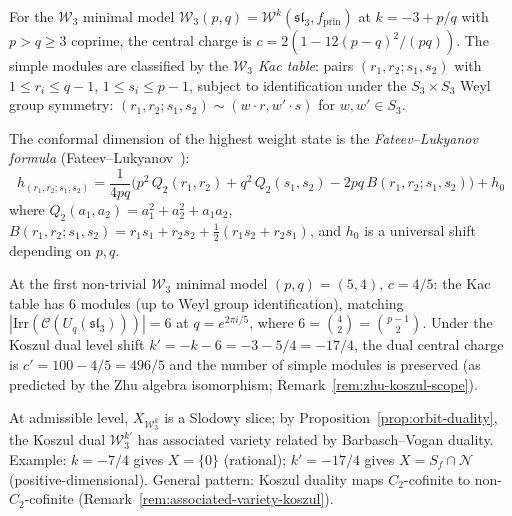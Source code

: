\begin{example}
\label{ex:w3-minimal-modules}
For the $\mathcal{W}_3$ minimal model
$\mathcal{W}_3(p,q) = \mathcal{W}^k(\mathfrak{sl}_3,
f_{\mathrm{prin}})$ at $k = -3 + p/q$ with $p > q \geq 3$
coprime, the central charge is
$c = 2(1 - 12(p-q)^2/(pq))$.  The simple modules are
classified by the \emph{$\mathcal{W}_3$ Kac table}: pairs
$(r_1, r_2; s_1, s_2)$ with
$1 \leq r_i \leq q - 1$, $1 \leq s_i \leq p - 1$, subject to
identification under the $S_3 \times S_3$ Weyl group symmetry:
$(r_1, r_2; s_1, s_2) \sim (w \cdot r, w' \cdot s)$ for
$w, w' \in S_3$.

The conformal dimension of the highest weight state is the
\emph{Fateev--Lukyanov formula}
(Fateev--Lukyanov~\cite{FL88}):
\begin{equation}\label{eq:w3-kac-dimension}
h_{(r_1,r_2;s_1,s_2)}
= \frac{1}{4pq}\bigl(
  p^2\, Q_2(r_1, r_2) + q^2\, Q_2(s_1, s_2) - 2pq\,
  B(r_1, r_2; s_1, s_2)
\bigr) + h_0
\end{equation}
where $Q_2(a_1, a_2) = a_1^2 + a_2^2 + a_1 a_2$,
$B(r_1, r_2; s_1, s_2) = r_1 s_1 + r_2 s_2 + \frac{1}{2}
(r_1 s_2 + r_2 s_1)$, and $h_0$ is a universal shift
depending on $p, q$.

At the first non-trivial $\mathcal{W}_3$ minimal model
$(p,q) = (5,4)$, $c = 4/5$: the Kac table has
$6$ modules (up to Weyl group identification), matching
$|\mathrm{Irr}(\mathcal{C}(U_q(\mathfrak{sl}_3)))| = 6$
at $q = e^{2\pi i/5}$, where
$6 = \binom{4}{2} = \binom{p-1}{2}$.  Under the Koszul dual
level shift $k' = -k - 6 = -3 - 5/4 = -17/4$, the dual
central charge is $c' = 100 - 4/5 = 496/5$ and the number of
simple modules is preserved (as predicted by the Zhu algebra
isomorphism; Remark~\ref{rem:zhu-koszul-scope}).
\end{example}

\begin{remark}
\label{rem:w3-orbit-duality}
At admissible level, $X_{\mathcal{W}_3^k}$ is a Slodowy slice; by Proposition~\ref{prop:orbit-duality}, the Koszul dual $\mathcal{W}_3^{k'}$ has associated variety related by Barbasch--Vogan duality.  Example: $k = -7/4$ gives $X = \{0\}$ (rational); $k' = -17/4$ gives $X = S_f \cap \mathcal{N}$ (positive-dimensional).  General pattern: Koszul duality maps $C_2$-cofinite to non-$C_2$-cofinite (Remark~\ref{rem:associated-variety-koszul}).
\end{remark}

